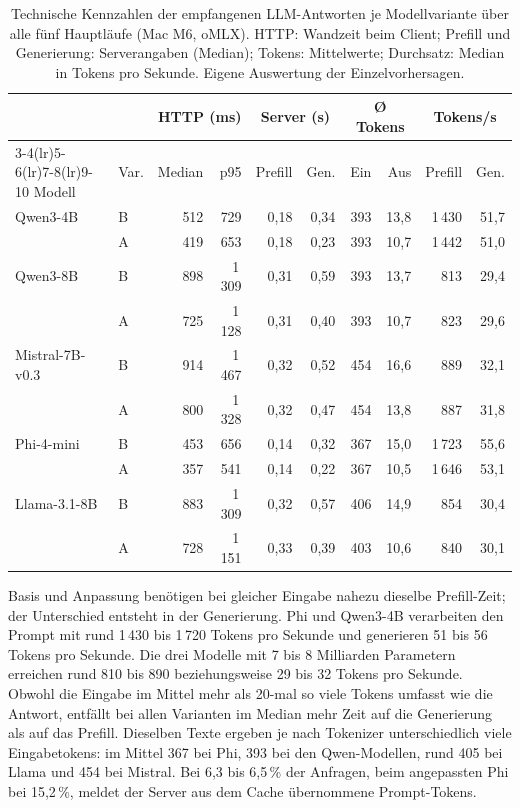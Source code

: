 \documentclass[12pt,twoside=false,a4paper,parskip]{scrbook}
\begin{document}
\begin{table}[htbp]
\centering\footnotesize
\caption{Technische Kennzahlen der empfangenen LLM-Antworten je Modellvariante über alle fünf Hauptläufe (Mac M6, oMLX). HTTP: Wandzeit beim Client; Prefill und Generierung: Serverangaben (Median); Tokens: Mittelwerte; Durchsatz: Median in Tokens pro Sekunde. Eigene Auswertung der Einzelvorhersagen.}
\label{tab:technische-kennzahlen}
\begin{tabular}{llrrrrrrrr}
\toprule
 & & \multicolumn{2}{c}{HTTP (ms)} & \multicolumn{2}{c}{Server (s)} & \multicolumn{2}{c}{Ø Tokens} & \multicolumn{2}{c}{Tokens/s} \\
\cmidrule(lr){3-4}\cmidrule(lr){5-6}\cmidrule(lr){7-8}\cmidrule(lr){9-10}
Modell & Var. & Median & p95 & Prefill & Gen. & Ein & Aus & Prefill & Gen. \\
\midrule
Qwen3-4B & B & 512 & 729 & 0{,}18 & 0{,}34 & 393 & 13{,}8 & 1\,430 & 51{,}7 \\
 & A & 419 & 653 & 0{,}18 & 0{,}23 & 393 & 10{,}7 & 1\,442 & 51{,}0 \\
Qwen3-8B & B & 898 & 1\,309 & 0{,}31 & 0{,}59 & 393 & 13{,}7 & 813 & 29{,}4 \\
 & A & 725 & 1\,128 & 0{,}31 & 0{,}40 & 393 & 10{,}7 & 823 & 29{,}6 \\
Mistral-7B-v0.3 & B & 914 & 1\,467 & 0{,}32 & 0{,}52 & 454 & 16{,}6 & 889 & 32{,}1 \\
 & A & 800 & 1\,328 & 0{,}32 & 0{,}47 & 454 & 13{,}8 & 887 & 31{,}8 \\
Phi-4-mini & B & 453 & 656 & 0{,}14 & 0{,}32 & 367 & 15{,}0 & 1\,723 & 55{,}6 \\
 & A & 357 & 541 & 0{,}14 & 0{,}22 & 367 & 10{,}5 & 1\,646 & 53{,}1 \\
Llama-3.1-8B & B & 883 & 1\,309 & 0{,}32 & 0{,}57 & 406 & 14{,}9 & 854 & 30{,}4 \\
 & A & 728 & 1\,151 & 0{,}33 & 0{,}39 & 403 & 10{,}6 & 840 & 30{,}1 \\
\bottomrule
\end{tabular}
\end{table}

Basis und Anpassung benötigen bei gleicher Eingabe nahezu dieselbe Prefill-Zeit; der Unterschied entsteht in der Generierung. Phi und Qwen3-4B verarbeiten den Prompt mit rund 1\,430 bis 1\,720 Tokens pro Sekunde und generieren 51 bis 56 Tokens pro Sekunde. Die drei Modelle mit 7 bis 8 Milliarden Parametern erreichen rund 810 bis 890 beziehungsweise 29 bis 32 Tokens pro Sekunde. Obwohl die Eingabe im Mittel mehr als 20-mal so viele Tokens umfasst wie die Antwort, entfällt bei allen Varianten im Median mehr Zeit auf die Generierung als auf das Prefill. Dieselben Texte ergeben je nach Tokenizer unterschiedlich viele Eingabetokens: im Mittel 367 bei Phi, 393 bei den Qwen-Modellen, rund 405 bei Llama und 454 bei Mistral. Bei 6{,}3 bis 6{,}5\,\% der Anfragen, beim angepassten Phi bei 15{,}2\,\%, meldet der Server aus dem Cache übernommene Prompt-Tokens.
\end{document}
